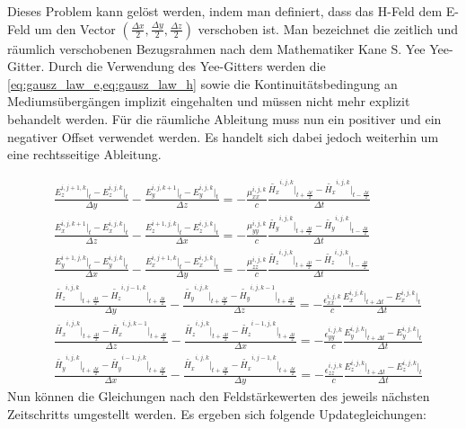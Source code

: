 \documentclass[11pt, ngerman]{article}
\begin{document}
Dieses Problem kann gel\"ost werden, indem man definiert, dass das H-Feld dem E-Feld um den Vector 
\(\left(\frac{\Delta x}{2}, \frac{\Delta y}{2}, \frac{\Delta z}{2}\right)\) verschoben ist.
Man bezeichnet die zeitlich und r\"aumlich verschobenen Bezugsrahmen nach dem Mathematiker Kane S. Yee Yee-Gitter.\cite{yee_original}
Durch die Verwendung des Yee-Gitters werden die \cref{eq:gausz_law_e,eq:gausz_law_h} sowie die Kontinuit\"atsbedingung an
Mediums\"uberg\"angen implizit eingehalten und m\"ussen nicht mehr explizit behandelt werden.
F\"ur die r\"aumliche Ableitung muss nun ein positiver und ein negativer Offset verwendet werden. Es handelt sich dabei jedoch weiterhin um eine rechtsseitige Ableitung.


\begin{align}
	&\frac{E_z^{i,j+1,k}\vert_t - E_z^{i,j,k}\vert_t}{\Delta y} - \frac{E_y^{i,j,k+1}\vert_t - E_y^{i,j,k}\vert_t}{\Delta z}
	= -\frac{\mu_{xx}^{i,j,k}}{c}\frac{\widetilde{H_x}^{i,j,k}\vert_{t+\frac{\Delta t}{2}} - \widetilde{H_x}^{i,j,k}\vert_{t-\frac{\Delta t}{2}}}{\Delta t}\\
	&\frac{E_x^{i,j,k+1}\vert_t - E_x^{i,j,k}\vert_t}{\Delta z} - \frac{E_z^{i+1,j,k}\vert_t - E_z^{i,j,k}\vert_t}{\Delta x}
	= -\frac{\mu_{yy}^{i,j,k}}{c}\frac{\widetilde{H_y}^{i,j,k}\vert_{t+\frac{\Delta t}{2}} - \widetilde{H_y}^{i,j,k}\vert_{t-\frac{\Delta t}{2}}}{\Delta t}\\
	&\frac{E_y^{i+1,j,k}\vert_t - E_y^{i,j,k}\vert_t}{\Delta x} - \frac{E_x^{i,j+1,k}\vert_t - E_x^{i,j,k}\vert_t}{\Delta y}
	= -\frac{\mu_{zz}^{i,j,k}}{c}\frac{\widetilde{H_z}^{i,j,k}\vert_{t+\frac{\Delta t}{2}} - \widetilde{H_z}^{i,j,k}\vert_{t-\frac{\Delta t}{2}}}{\Delta t}\\
	&\frac{\widetilde{H_z}^{i,j,k}\vert_{t+\frac{\Delta t}{2}} - \widetilde{H_z}^{i,j-1,k}\vert_{t+\frac{\Delta t}{2}}}{\Delta y}
	- \frac{\widetilde{H_y}^{i,j,k}\vert_{t+\frac{\Delta t}{2}} - \widetilde{H_y}^{i,j,k-1}\vert_{t+\frac{\Delta t}{2}}}{\Delta z}
	= -\frac{\epsilon_{xx}^{i,j,k}}{c}\frac{E_x^{i,j,k}\vert_{t+\Delta t} - E_x^{i,j,k}\vert_t}{\Delta t}\\
	&\frac{\widetilde{H_x}^{i,j,k}\vert_{t+\frac{\Delta t}{2}} - \widetilde{H_x}^{i,j,k-1}\vert_{t+\frac{\Delta t}{2}}}{\Delta z}
	- \frac{\widetilde{H_z}^{i,j,k}\vert_{t+\frac{\Delta t}{2}} - \widetilde{H_z}^{i-1,j,k}\vert_{t+\frac{\Delta t}{2}}}{\Delta x}
	= -\frac{\epsilon_{yy}^{i,j,k}}{c}\frac{E_y^{i,j,k}\vert_{t+\Delta t} - E_y^{i,j,k}\vert_t}{\Delta t}\\
	&\frac{\widetilde{H_y}^{i,j,k}\vert_{t+\frac{\Delta t}{2}} - \widetilde{H_y}^{i-1,j,k}\vert_{t+\frac{\Delta t}{2}}}{\Delta x}
	- \frac{\widetilde{H_x}^{i,j,k}\vert_{t+\frac{\Delta t}{2}} - \widetilde{H_x}^{i,j-1,k}\vert_{t+\frac{\Delta t}{2}}}{\Delta y}
	= -\frac{\epsilon_{zz}^{i,j,k}}{c}\frac{E_z^{i,j,k}\vert_{t+\Delta t} - E_z^{i,j,k}\vert_t}{\Delta t}
\end{align}
\newpage
\noindent Nun k\"onnen die Gleichungen nach den Feldst\"arkewerten des jeweils n\"achsten Zeitschritts umgestellt werden.
Es ergeben sich folgende Updategleichungen:
\end{document}
